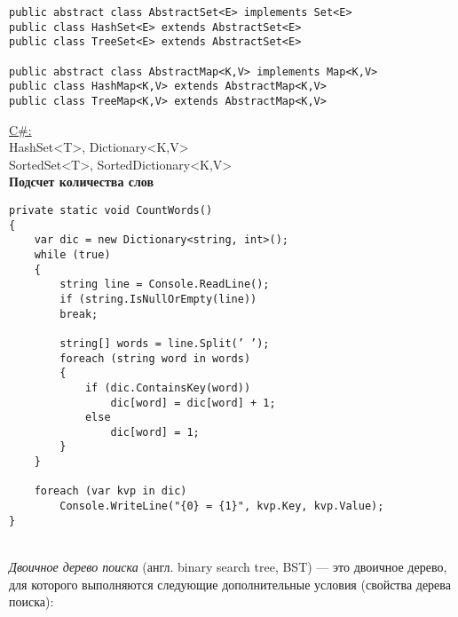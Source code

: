 \begin{verbatim}
public abstract class AbstractSet<E> implements Set<E>
public class HashSet<E> extends AbstractSet<E>
public class TreeSet<E> extends AbstractSet<E>

public abstract class AbstractMap<K,V> implements Map<K,V>
public class HashMap<K,V> extends AbstractMap<K,V>
public class TreeMap<K,V> extends AbstractMap<K,V>
\end{verbatim}
\underline{C\#:} \\
HashSet<T>, Dictionary<K,V> \\
SortedSet<T>, SortedDictionary<K,V>\\
{\bf Подсчет количества слов}
\begin{verbatim}
private static void CountWords()
{
    var dic = new Dictionary<string, int>();
    while (true)
    {
        string line = Console.ReadLine();
        if (string.IsNullOrEmpty(line))
        break;
        
        string[] words = line.Split(’ ’);
        foreach (string word in words)
        {
            if (dic.ContainsKey(word))
                dic[word] = dic[word] + 1;
            else
                dic[word] = 1;
        }
    }
    
    foreach (var kvp in dic)
        Console.WriteLine("{0} = {1}", kvp.Key, kvp.Value);
}
\end{verbatim}

\\
\textit{Двоичное дерево поиска} (англ. binary search tree, BST) — это двоичное дерево, для которого выполняются следующие дополнительные условия (свойства дерева поиска):

